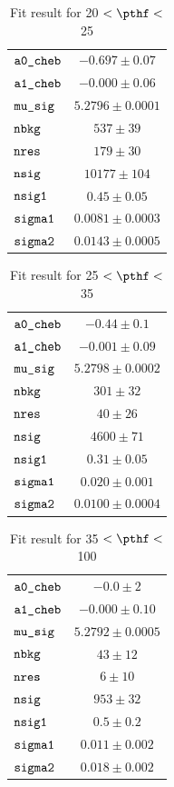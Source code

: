 \begin{table}[H]
    \centering
    \caption{Fit result for 20 $ < \pthf < $ 25}
    \label{tab:fit_results_pthf13}
\begin{tabular}{lc}
$\verb+a0_cheb+ $ & $ -0.697\pm 0.07$\\
$\verb+a1_cheb+ $ & $ -0.000\pm 0.06$\\
$\verb+mu_sig+ $ & $  5.2796\pm 0.0001$\\
$\verb+nbkg+ $ & $  537\pm 39$\\
$\verb+nres+ $ & $  179\pm 30$\\
$\verb+nsig+ $ & $  10177\pm 104$\\
$\verb+nsig1+ $ & $  0.45\pm 0.05$\\
$\verb+sigma1+ $ & $  0.0081\pm 0.0003$\\
$\verb+sigma2+ $ & $  0.0143\pm 0.0005$\\
\end{tabular}
\end{table}
\begin{table}[H]
    \centering
    \caption{Fit result for 25 $ < \pthf < $ 35}
    \label{tab:fit_results_pthf14}
\begin{tabular}{lc}
$\verb+a0_cheb+ $ & $ -0.44\pm 0.1$\\
$\verb+a1_cheb+ $ & $ -0.001\pm 0.09$\\
$\verb+mu_sig+ $ & $  5.2798\pm 0.0002$\\
$\verb+nbkg+ $ & $  301\pm 32$\\
$\verb+nres+ $ & $  40\pm 26$\\
$\verb+nsig+ $ & $  4600\pm 71$\\
$\verb+nsig1+ $ & $  0.31\pm 0.05$\\
$\verb+sigma1+ $ & $  0.020\pm 0.001$\\
$\verb+sigma2+ $ & $  0.0100\pm 0.0004$\\
\end{tabular}
\end{table}
\begin{table}[H]
    \centering
    \caption{Fit result for 35 $ < \pthf < $ 100}
    \label{tab:fit_results_pthf15}
\begin{tabular}{lc}
$\verb+a0_cheb+ $ & $ -0.0\pm 2$\\
$\verb+a1_cheb+ $ & $ -0.000\pm 0.10$\\
$\verb+mu_sig+ $ & $  5.2792\pm 0.0005$\\
$\verb+nbkg+ $ & $  43\pm 12$\\
$\verb+nres+ $ & $  6\pm 10$\\
$\verb+nsig+ $ & $  953\pm 32$\\
$\verb+nsig1+ $ & $  0.5\pm 0.2$\\
$\verb+sigma1+ $ & $  0.011\pm 0.002$\\
$\verb+sigma2+ $ & $  0.018\pm 0.002$\\
\end{tabular}
\end{table}

